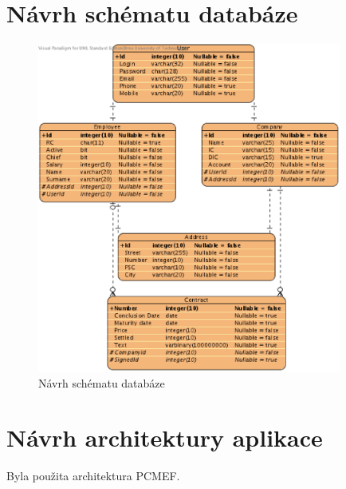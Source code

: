 \pagebreak

\section*{Návrh schématu databáze}

\begin{figure}[H]
	\begin{center}
		\includegraphics[width=10cm,keepaspectratio]{include/schema_stage1}
	\end{center}
	\caption{Návrh schématu databáze}
	\label{fig:SchemaStage1}
\end{figure}

\pagebreak

\section*{Návrh architektury aplikace}

Byla použita architektura PCMEF.

